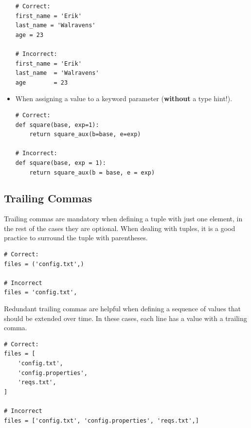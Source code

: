 \documentclass{tufte-handout}
\begin{document}
\begin{itemize}
\begin{mdframed}
\begin{verbatim}
# Correct:
first_name = 'Erik'
last_name = 'Walravens'
age = 23

# Incorrect:
first_name = 'Erik'
last_name  = 'Walravens'
age        = 23

\end{verbatim}
\end{mdframed}	

	\item When assigning a value to a keyword parameter (\textbf{without} a type hint!).
	
\begin{mdframed}
\begin{verbatim}
# Correct:
def square(base, exp=1):
    return square_aux(b=base, e=exp)
    
# Incorrect:
def square(base, exp = 1):
    return square_aux(b = base, e = exp)
\end{verbatim}
\end{mdframed}
	
\end{itemize}

\subsection{Trailing Commas}
Trailing commas are mandatory when defining a tuple with just one element, in the rest of the cases they are optional.
When dealing with tuples, it is a good practice to surround the tuple with parentheses.

\begin{mdframed}
\begin{verbatim}
# Correct:
files = ('config.txt',)

# Incorrect
files = 'config.txt',
\end{verbatim}
\end{mdframed}

Redundant trailing commas are helpful when defining a sequence of values that should be extended over time.
In these cases, each line has a value with a trailing comma.

\begin{mdframed}
\begin{verbatim}
# Correct:
files = [
    'config.txt',
    'config.properties',
    'reqs.txt',
]

# Incorrect
files = ['config.txt', 'config.properties', 'reqs.txt',]
\end{verbatim}
\end{mdframed}
\end{document}

